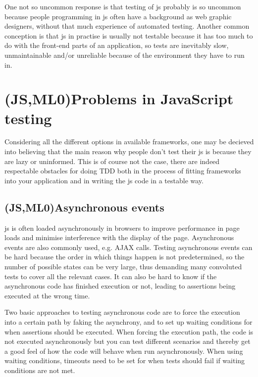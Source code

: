 \documentclass[11pt]{article}
\begin{document}
One not so uncommon response is that testing of \gls{js} probably is so uncommon because people programming in \gls{js} often have a background as web graphic designers, without that much experience of automated testing. Another common conception is that \gls{js} in practise is usually not testable because it has too much to do with the front-end parts of an application, so tests are inevitably slow, unmaintainable and/or unreliable because of the environment they have to run in.


\section{(JS,ML0)Problems in JavaScript testing}
\label{sec:jsproblems}

Considering all the different options in available frameworks, one may be decieved into believing that the main reason why people don't test their \gls{js} is because they are lazy or uninformed. This is of course not the case, there are indeed respectable obstacles for doing TDD both in the process of fitting frameworks into your application and in writing the \gls{js} code in a testable way. %

\subsection{(JS,ML0)Asynchronous events}

\gls{js} is often loaded asynchronously in browsers to improve performance in page loads and minimise interference with the display of the page. Asynchronous events are also commonly used, e.g. AJAX calls. Testing asynchronous events can be hard because the order in which things happen is not predetermined, so the number of possible states can be very large, thus demanding many convoluted tests to cover all the relevant cases. It can also be hard to know if the asynchronous code has finished execution or not, leading to assertions being executed at the wrong time.

Two basic approaches to testing asynchronous code are to force the execution into a certain path by faking the asynchrony, and to set up waiting conditions for when assertions should be executed. When forcing the execution path, the code is not executed asynchronously but you can test different scenarios and thereby get a good feel of how the code will behave when run asynchronously. When using waiting conditions, timeouts need to be set for when tests should fail if waiting conditions are not met.
\end{document}
